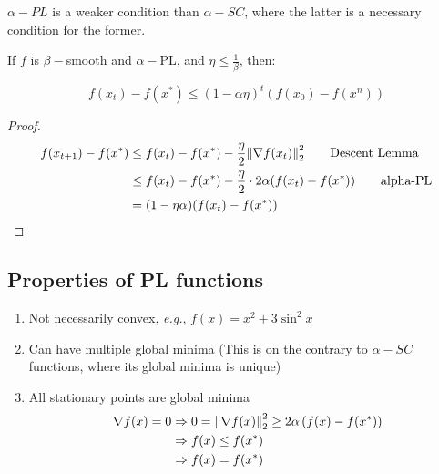 \begin{remark}
    \(\alpha-PL\) is a weaker condition than \(\alpha-SC\), where the latter is a necessary 
    condition for the former. 
\end{remark}

\begin{theorem}

If \(f\) is \(\beta-\)smooth and \(\alpha-\)PL, and \(\eta \leq \frac{1}{\beta}\), then: 

\[
    f(x_t) - f(x^*) \leq (1 - \alpha \eta)^t \left( f(x_0) - f(x^n) \right)
\]
\end{theorem}

\begin{proof}
    \begin{align*}
        f(x_{t+1}) - f(x^*) &\leq f(x_t) - f(x^*)  - \frac{\eta}{2} \norm{\nabla f(x_t)}^2_2  \tag*{Descent Lemma} \\ 
        &\leq f(x_t) - f(x^*) - \frac{\eta}{2} \cdot 2 \alpha (f(x_t) - f(x^*)) \tag*{alpha-PL} \\ 
        &= (1 - \eta \alpha) (f(x_t) - f(x^*))
    \end{align*}
\end{proof}

\subsection*{Properties of PL functions} 

\begin{enumerate}
    \item Not necessarily convex, \emph{e.g.}, \(f(x) = x^2 + 3 \sin^2 x\) 
    \item Can have multiple global minima (This is on the contrary to \(\alpha-SC\) functions, where 
    its global minima is unique)
    \item All stationary points are global minima 
    \begin{align*}
        \nabla f(x) = 0 &\Rightarrow 0 = \norm{\nabla f(x)}_2^2 \geq 2 \alpha \left(f(x) - f(x^*)\right) \\ 
        &\Rightarrow f(x) \leq f(x^*) \\ 
        &\Rightarrow f(x) = f(x^*)
    \end{align*}
\end{enumerate}

